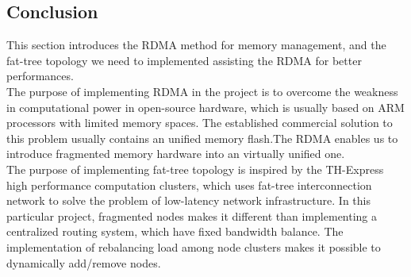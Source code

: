 \documentclass[11pt,openright,a4paper]{report}
\begin{document}
\subsection{Conclusion}
This section introduces the RDMA method for memory management, and the fat-tree topology we need to implemented assisting the RDMA for better performances.\\
The purpose of implementing RDMA in the project is to overcome the weakness in computational power in open-source hardware, which is usually based on ARM processors with limited memory spaces. The established commercial solution to this problem usually contains an unified memory flash.The RDMA enables us to introduce fragmented memory hardware into an virtually unified one. \\
The purpose of implementing fat-tree topology is inspired by the TH-Express high performance computation clusters, which uses fat-tree interconnection network to solve the problem of low-latency network infrastructure\cite{pang2014th}. In this particular project, fragmented nodes makes it different than implementing a centralized routing system, which have fixed bandwidth balance. The implementation of rebalancing load among node clusters makes it possible to dynamically add/remove nodes.\\
\end{document}
